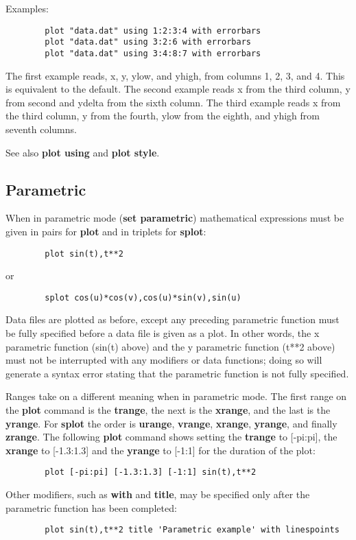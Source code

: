 Examples:

\begin{verbatim}
        plot "data.dat" using 1:2:3:4 with errorbars
        plot "data.dat" using 3:2:6 with errorbars
        plot "data.dat" using 3:4:8:7 with errorbars
\end{verbatim}

The first example reads, x, y, ylow, and yhigh, from columns 1, 2, 3,
and 4. This is equivalent to the default.  The second example reads x
from the third column, y from second and ydelta from the sixth column.
The third example reads x from the third column, y from the fourth,
ylow from the eighth, and yhigh from seventh columns.

See also {\bf plot using} and {\bf plot style}.
\subsection{Parametric}
When in parametric mode ({\bf set parametric}) mathematical expressions must
be given in pairs for {\bf plot} and in triplets for {\bf splot}:
\begin{verbatim}
        plot sin(t),t**2
\end{verbatim}
or
\begin{verbatim}
        splot cos(u)*cos(v),cos(u)*sin(v),sin(u)
\end{verbatim}

Data files are plotted as before, except any preceding parametric
function must be fully specified before a data file is given as a
plot. In other words, the x parametric function (sin(t) above) and
the y parametric function (t**2 above) must not be interrupted with
any modifiers or data functions; doing so will generate a syntax error
stating that the parametric function is not fully specified.

Ranges take on a different meaning when in parametric mode. The first
range on the {\bf plot} command is the {\bf trange}, the next is the {\bf xrange},
and the last is the {\bf yrange}. For {\bf splot} the order is {\bf urange},
{\bf vrange}, {\bf xrange}, {\bf yrange}, and finally {\bf zrange}. The following
{\bf plot} command shows setting the {\bf trange} to [-pi:pi], the {\bf xrange} to
[-1.3:1.3] and the {\bf yrange} to [-1:1] for the duration of the plot:
\begin{verbatim}
        plot [-pi:pi] [-1.3:1.3] [-1:1] sin(t),t**2
\end{verbatim}

Other modifiers, such as {\bf with} and {\bf title}, may be specified only
after the parametric function has been completed:
\begin{verbatim}
        plot sin(t),t**2 title 'Parametric example' with linespoints
\end{verbatim}
